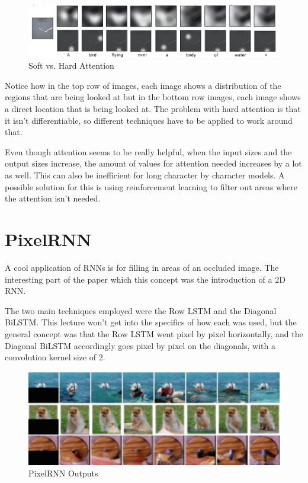 \documentclass{article}
\begin{document}
\begin{figure}[H]
\centering
\includegraphics[scale=.5]{softvhard_attention.png}
\caption{Soft vs. Hard Attention}
\label{fig:softvhard_attention}
\end{figure}

Notice how in the top row of images, each image shows a distribution of the regions that are being looked at but in the bottom row images, each image shows a direct location that is being looked at. The problem with hard attention is that it isn't differentiable, so different techniques have to be applied to work around that. 

Even though attention seems to be really helpful, when the input sizes and the output sizes increase, the amount of values for attention needed increases by a lot as well. This can also be inefficient for long character by character models. A possible solution for this is using reinforcement learning to filter out areas where the attention isn't needed.


\section{PixelRNN}

A cool application of RNNs is for filling in areas of an occluded image. The interesting part of the paper which this concept was the introduction of a 2D RNN.

The two main techniques employed were the Row LSTM and the Diagonal BiLSTM. This lecture won't get into the specifics of how each was used, but the general concept was that the Row LSTM went pixel by pixel horizontally, and the Diagonal BiLSTM accordingly goes pixel by pixel on the diagonals, with a convolution kernel size of 2.

\begin{figure}[H]
\centering
\includegraphics[scale=.225]{pixelrnn.png}
\caption{PixelRNN Outputs}
\label{fig:pixelrnn}
\end{figure}
\end{document}
